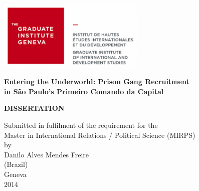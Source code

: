 \begin{titlepage}
\begin{flushleft}
	\includegraphics[width=7cm]{gfx/logo.png}
\end{flushleft}
\vspace{4cm}
\begin{center}
	\begin{large}
		\textbf{Entering the Underworld: Prison Gang Recruitment\\ in S\~{a}o Paulo's Primeiro Comando da Capital}\\
	\end{large}
	\vspace{3cm}
	\begin{large}
		\textbf{DISSERTATION}\\
	\end{large}
	Submitted in fulfilment of the requirement for the \\
	Master in International Relations / Political Science (MIRPS)\\
	\vspace{2cm}
	by \\
	Danilo Alves Mendes Freire\\
	(Brazil)\\
	\vspace{1.5cm}
	Geneva \\
	2014
\end{center}
\end{titlepage}